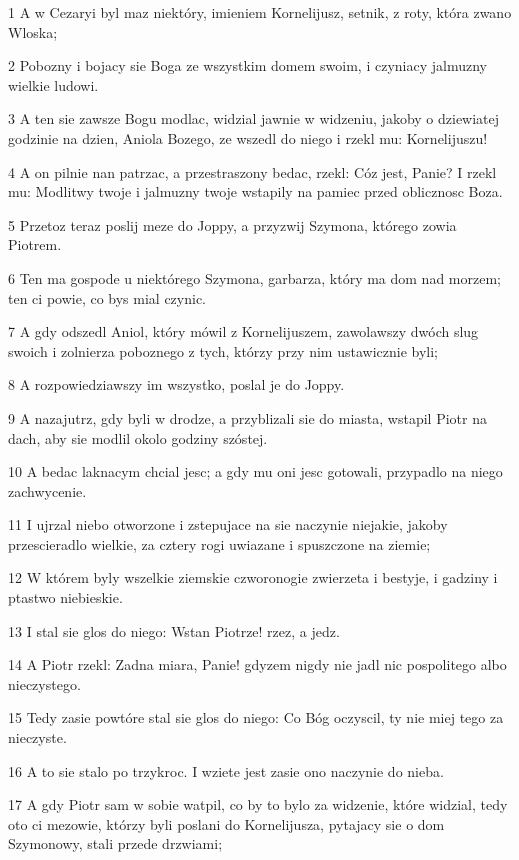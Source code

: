 \par 1 A w Cezaryi byl maz niektóry, imieniem Kornelijusz, setnik, z roty, która zwano Wloska;
\par 2 Pobozny i bojacy sie Boga ze wszystkim domem swoim, i czyniacy jalmuzny wielkie ludowi.
\par 3 A ten sie zawsze Bogu modlac, widzial jawnie w widzeniu, jakoby o dziewiatej godzinie na dzien, Aniola Bozego, ze wszedl do niego i rzekl mu: Kornelijuszu!
\par 4 A on pilnie nan patrzac, a przestraszony bedac, rzekl: Cóz jest, Panie? I rzekl mu: Modlitwy twoje i jalmuzny twoje wstapily na pamiec przed oblicznosc Boza.
\par 5 Przetoz teraz poslij meze do Joppy, a przyzwij Szymona, którego zowia Piotrem.
\par 6 Ten ma gospode u niektórego Szymona, garbarza, który ma dom nad morzem; ten ci powie, co bys mial czynic.
\par 7 A gdy odszedl Aniol, który mówil z Kornelijuszem, zawolawszy dwóch slug swoich i zolnierza poboznego z tych, którzy przy nim ustawicznie byli;
\par 8 A rozpowiedziawszy im wszystko, poslal je do Joppy.
\par 9 A nazajutrz, gdy byli w drodze, a przyblizali sie do miasta, wstapil Piotr na dach, aby sie modlil okolo godziny szóstej.
\par 10 A bedac laknacym chcial jesc; a gdy mu oni jesc gotowali, przypadlo na niego zachwycenie.
\par 11 I ujrzal niebo otworzone i zstepujace na sie naczynie niejakie, jakoby przescieradlo wielkie, za cztery rogi uwiazane i spuszczone na ziemie;
\par 12 W którem byly wszelkie ziemskie czworonogie zwierzeta i bestyje, i gadziny i ptastwo niebieskie.
\par 13 I stal sie glos do niego: Wstan Piotrze! rzez, a jedz.
\par 14 A Piotr rzekl: Zadna miara, Panie! gdyzem nigdy nie jadl nic pospolitego albo nieczystego.
\par 15 Tedy zasie powtóre stal sie glos do niego: Co Bóg oczyscil, ty nie miej tego za nieczyste.
\par 16 A to sie stalo po trzykroc. I wziete jest zasie ono naczynie do nieba.
\par 17 A gdy Piotr sam w sobie watpil, co by to bylo za widzenie, które widzial, tedy oto ci mezowie, którzy byli poslani do Kornelijusza, pytajacy sie o dom Szymonowy, stali przede drzwiami;
